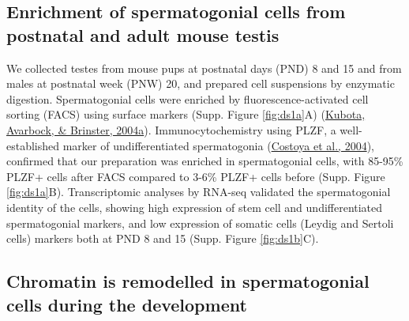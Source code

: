 \documentclass[12pt,twoside]{reedthesis}
\begin{document}
\hypertarget{enrichment-of-spermatogonial-cells-from-postnatal-and-adult-mouse-testis}{%
\subsection{Enrichment of spermatogonial cells from postnatal and adult mouse testis}\label{enrichment-of-spermatogonial-cells-from-postnatal-and-adult-mouse-testis}}

We collected testes from mouse pups at postnatal days (PND) 8 and 15 and
from males at postnatal week (PNW) 20, and prepared cell suspensions by
enzymatic digestion. Spermatogonial cells were enriched by
fluorescence-activated cell sorting (FACS) using surface markers (Supp. Figure \ref{fig:ds1a}A) (\protect\hyperlink{ref-kubota2004a}{Kubota, Avarbock, \& Brinster, 2004a}). Immunocytochemistry using PLZF, a well-established
marker of undifferentiated spermatogonia (\protect\hyperlink{ref-costoya2004}{Costoya et al., 2004}), confirmed that
our preparation was enriched in spermatogonial cells, with 85-95\% PLZF+
cells after FACS compared to 3-6\% PLZF+ cells before (Supp. Figure \ref{fig:ds1a}B).
Transcriptomic analyses by RNA-seq validated the spermatogonial identity
of the cells, showing high expression of stem cell and undifferentiated
spermatogonial markers, and low expression of somatic cells (Leydig and
Sertoli cells) markers both at PND 8 and 15 (Supp. Figure \ref{fig:ds1b}C).

\hypertarget{chromatin-is-remodelled-in-spermatogonial-cells-during-the-development}{%
\subsection{Chromatin is remodelled in spermatogonial cells during the development}\label{chromatin-is-remodelled-in-spermatogonial-cells-during-the-development}}
\end{document}
